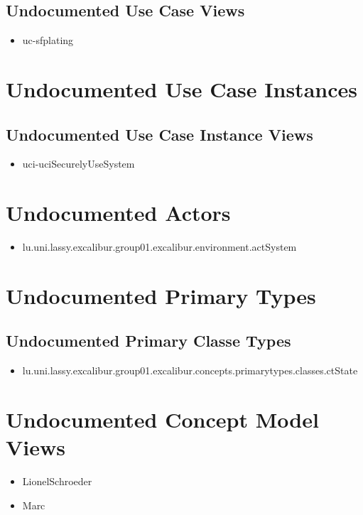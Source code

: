 \subsection[Undocumented Use Case Views]{Undocumented Use Case Views}
\begin{itemize}
\item uc-sfplating 
\end{itemize}




\section[Undocumented Use Case Instances]{Undocumented Use Case Instances}




\subsection[Undocumented Use Case Instance Views]{Undocumented Use Case Instance Views}
\begin{itemize}
\item uci-uciSecurelyUseSystem 
\end{itemize}


\section[Undocumented Actors]{Undocumented Actors}
\begin{itemize}
\item lu.uni.lassy.excalibur.group01.excalibur.environment.actSystem 
\end{itemize}




\section[Undocumented Primary Types]{Undocumented Primary Types}

\subsection[Undocumented Primary Classe Types]{Undocumented Primary Classe Types}
\begin{itemize}
\item lu.uni.lassy.excalibur.group01.excalibur.concepts.primarytypes.classes.ctState 
\end{itemize}















\section[Undocumented Concept Model Views]{Undocumented Concept Model Views}
\begin{itemize}
\item LionelSchroeder 
\item Marc 
\end{itemize}











